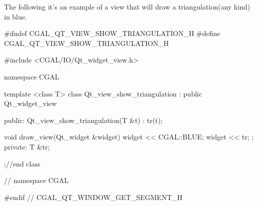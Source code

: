 \ccExample
The following it's an example of a view that will draw a triangulation(any 
kind) in blue.
\begin{ccExampleCode}
#ifndef CGAL_QT_VIEW_SHOW_TRIANGULATION_H
#define CGAL_QT_VIEW_SHOW_TRIANGULATION_H

#include <CGAL/IO/Qt_widget_view.h>

namespace CGAL {

template <class T>
class Qt_view_show_triangulation : public Qt_widget_view
{
public:
  Qt_view_show_triangulation(T &t) : tr(t){};

  void draw_view(Qt_widget &widget)
  {
    widget << CGAL::BLUE; 
    widget << tr;
  };
private:
  T &tr;
};//end class 

} // namespace CGAL

#endif // CGAL_QT_WINDOW_GET_SEGMENT_H
\end{ccExampleCode}










